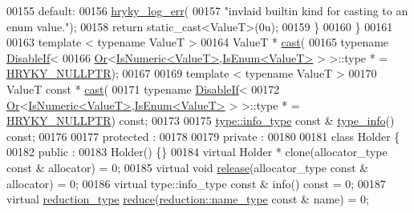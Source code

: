 \begin{DoxyCode}
00155         \textcolor{keywordflow}{default}:
00156             \hyperlink{log__writer__common_8h_ae5ad3dabb33f594695ef40753cb78aad}{hryky_log_err}(
00157                 \textcolor{stringliteral}{"invlaid builtin kind for casting to an enum value."});
00158             \textcolor{keywordflow}{return} \textcolor{keyword}{static\_cast<}ValueT\textcolor{keyword}{>}(0u);
00159         \}
00160     \}
00161 
00163     \textcolor{keyword}{template} < \textcolor{keyword}{typename} ValueT >
00164     ValueT * \hyperlink{classhryky_1_1_any_ac0e23acd8cc393f4f9c4188229cb9c9e}{cast}(
00165         \textcolor{keyword}{typename} \hyperlink{classhryky_1_1_disable_if}{DisableIf}<
00166             \hyperlink{classhryky_1_1_or}{Or}<\hyperlink{classhryky_1_1_is_numeric}{IsNumeric<ValueT>},\hyperlink{classhryky_1_1_is_enum}{IsEnum<ValueT>} > >::type * = \hyperlink{common_8h_a4cd4ac09cfcdbd6b30ee69afc156e210}{HRYKY_NULLPTR});
00167 
00169     \textcolor{keyword}{template} < \textcolor{keyword}{typename} ValueT >
00170     ValueT \textcolor{keyword}{const} * \hyperlink{classhryky_1_1_any_ac0e23acd8cc393f4f9c4188229cb9c9e}{cast}(
00171         \textcolor{keyword}{typename} \hyperlink{classhryky_1_1_disable_if}{DisableIf}<
00172             \hyperlink{classhryky_1_1_or}{Or}<\hyperlink{classhryky_1_1_is_numeric}{IsNumeric<ValueT>},\hyperlink{classhryky_1_1_is_enum}{IsEnum<ValueT>} > >::type * = \hyperlink{common_8h_a4cd4ac09cfcdbd6b30ee69afc156e210}{HRYKY_NULLPTR}) \textcolor{keyword}{
      const};
00173 
00175     \hyperlink{classhryky_1_1type_1_1_info}{type::info_type} \textcolor{keyword}{const} & \hyperlink{classhryky_1_1_any_a17068d39ea56f8b086e4c97086082b30}{type_info}() \textcolor{keyword}{const};
00176 
00177 \textcolor{keyword}{protected} :
00178 
00179 \textcolor{keyword}{private} :
00180 
00181     \textcolor{keyword}{class }Holder \{
00182     \textcolor{keyword}{public} :
00183         Holder() \{\}
00184         \textcolor{keyword}{virtual} Holder * clone(allocator\_type \textcolor{keyword}{const} & allocator) = 0;
00185         \textcolor{keyword}{virtual} \textcolor{keywordtype}{void} \hyperlink{namespacehryky_a9bdf380c3703ef316b807edae92a930a}{release}(allocator\_type \textcolor{keyword}{const} & allocator) = 0;
00186         \textcolor{keyword}{virtual} type::info\_type \textcolor{keyword}{const} & info() \textcolor{keyword}{const} = 0;
00187         \textcolor{keyword}{virtual} \hyperlink{namespacehryky_a343a9a4c36a586be5c2693156200eadc}{reduction_type} \hyperlink{classhryky_1_1_any_a53cbd925fa67505daab6e79749559517}{reduce}(\hyperlink{namespacehryky_1_1reduction_ac686c30a4c8d196bbd0f05629a6b921f}{reduction::name_type} \textcolor{keyword}{const} & name) = 0;

\end{DoxyCode}
